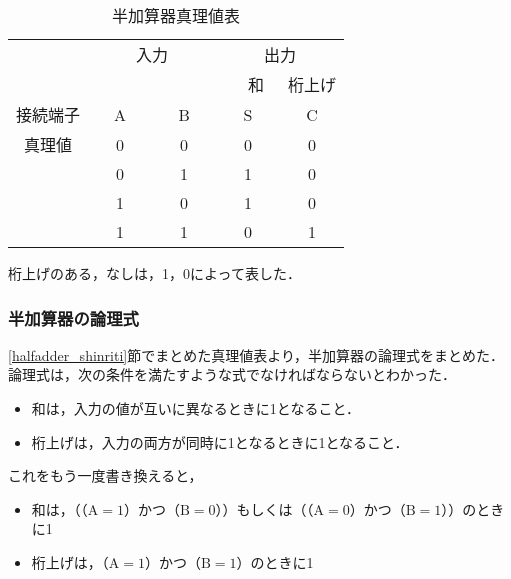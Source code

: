 \begin {table}[ht]
	\begin {center}
		\caption {半加算器真理値表}%
		\begin {tabular}{c|cc|cc}\hline
			\multicolumn{1}{c|}{}&%
			\multicolumn{2}{c}{入力}&%
			\multicolumn{2}{|c}{出力}\\ %
			\multicolumn{1}{c|}{}&
			\multicolumn{1}{c}{　　　}&
			\multicolumn{1}{c}{　　　}&%
			\multicolumn{1}{|c}{　和　}&%
			\multicolumn{1}{c}{桁上げ}\\ %
			\hline
			\multicolumn{1}{c|}{接続端子}&%
			\multicolumn{1}{c}{A}&%
			\multicolumn{1}{c}{B}&%
			\multicolumn{1}{|c}{S}&%
			\multicolumn{1}{c}{C}\\%
			\hline
			真理値&0&0&0&0\\%
			&0&1&1&0\\%
			&1&0&1&0\\%
			&1&1&0&1\\
			\hline
		\end{tabular}
		\label {tab:halfadder_shinrititab}%
	\end{center}
\end{table}


桁上げのある，なしは，1，0によって表した．

%
%
\subsubsection{半加算器の論理式}
\label{halfadder_ronrishiki}
\ref{halfadder_shinriti}節でまとめた真理値表より，半加算器の論理式をまとめた．論理式は，次の条件を満たすような式でなければならないとわかった．

\begin{itemize}
	\item 和は，入力の値が互いに異なるときに1となること．
	\item 桁上げは，入力の両方が同時に1となるときに1となること．
\end{itemize}

これをもう一度書き換えると，

\begin{itemize}
	\item 和は，（（$\mathrm{A}=1$）かつ（$\mathrm{B}=0$））もしくは（（$\mathrm{A}=0$）かつ（$\mathrm{B}=1$））のときに1
	\item 桁上げは，（$\mathrm{A}=1$）かつ（$\mathrm{B}=1$）のときに1
\end{itemize}


